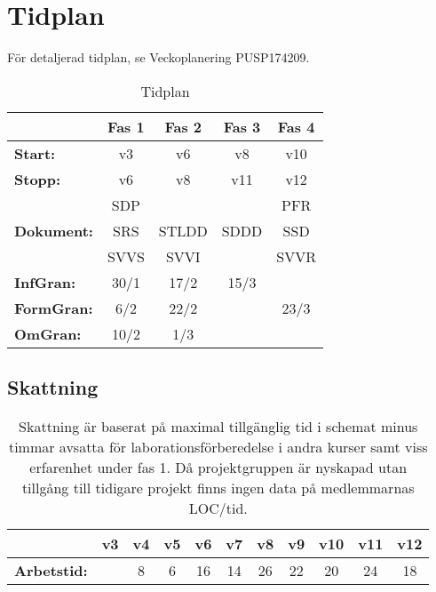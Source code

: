 \documentclass[paper=a4, fontsize=11pt,twoside]{article}
\begin{document}
\section{Tidplan}
För detaljerad tidplan, se Veckoplanering PUSP174209. 

\begin{table}[H]
\centering
\begin{tabular}{| l | c | c | c | c |} %
\hline
 & \textbf{Fas 1} & \textbf{Fas 2} & \textbf{Fas 3} & \textbf{Fas 4}\\
\hline
\hline
\textbf{Start:} & v3 & v6 & v8 & v10 \\
\hline
\textbf{Stopp:} & v6 & v8 & v11 & v12 \\
\hline
 				& SDP & & & PFR \\
\textbf{Dokument:} & SRS & STLDD & SDDD & SSD \\
 				& SVVS & SVVI & & SVVR \\
\hline
\textbf{InfGran:} & 30/1 & 17/2 & 15/3 & 	 \\
\hline
\textbf{FormGran:} & 6/2 & 22/2 &	 & 23/3 \\
\hline
\textbf{OmGran:} & 10/2 & 1/3 &		 & \\
\hline
\end{tabular}
{ \fontsize{6pt}{0.2cm}\selectfont \caption{Tidplan}}
\end{table}


\subsection*{Skattning}
\begin{table}[H]
\centering
\begin{tabular}{| l | c | c | c | c | c | c | c | c | c | c |}
\hline
 & \textbf{v3} & \textbf{v4} & \textbf{v5} & \textbf{v6} & \textbf{v7} & \textbf{v8} & \textbf{v9} & \textbf{v10} & \textbf{v11} & \textbf{v12}\\
\hline
\textbf{Arbetstid:}  &  & 8 & 6 & 16 & 14 & 26 & 22 & 20 & 24 & 18 \\
\hline
\end{tabular}\\

{ \fontsize{6pt}{0.2cm}\selectfont \caption{Skattning är baserat på maximal tillgänglig tid i schemat minus timmar avsatta för laborationsförberedelse i andra kurser samt viss erfarenhet under fas 1. Då projektgruppen är nyskapad utan tillgång till tidigare projekt finns ingen data på medlemmarnas LOC/tid.}}
\end{table}
\end{document}
